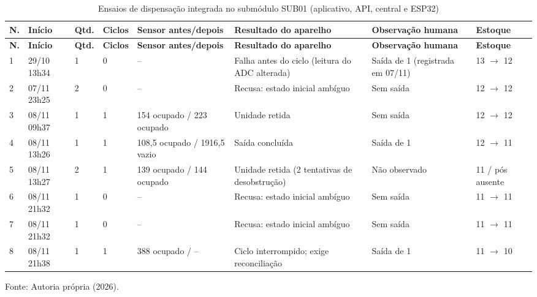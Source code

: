 
{\small\setlength{\tabcolsep}{3pt}\begin{longtable}{p{}p{}p{}p{}p{}p{}p{}p{}}
\caption{Ensaios de dispensação integrada no submódulo SUB01 (aplicativo, API, central e ESP32)}\label{tab:ensaios-dispensacao}\\
\hline
\textbf{N.} & \textbf{Início} & \textbf{Qtd.} & \textbf{Ciclos} & \textbf{Sensor antes/depois} & \textbf{Resultado do aparelho} & \textbf{Observação humana} & \textbf{Estoque}\\\hline
\endfirsthead\hline
\textbf{N.} & \textbf{Início} & \textbf{Qtd.} & \textbf{Ciclos} & \textbf{Sensor antes/depois} & \textbf{Resultado do aparelho} & \textbf{Observação humana} & \textbf{Estoque}\\\hline
\endhead
1 & 29/10 13h34 & 1 & 0 & -- & Falha antes do ciclo (leitura do ADC alterada) & Saída de 1 (registrada em 07/11) & 13 $\rightarrow$ 12\\\hline
2 & 07/11 23h25 & 2 & 0 & -- & Recusa: estado inicial ambíguo & Sem saída & 12 $\rightarrow$ 12\\\hline
3 & 08/11 09h37 & 1 & 1 & 154 ocupado / 223 ocupado & Unidade retida & Sem saída & 12 $\rightarrow$ 12\\\hline
4 & 08/11 13h26 & 1 & 1 & 108,5 ocupado / 1916,5 vazio & Saída concluída & Saída de 1 & 12 $\rightarrow$ 11\\\hline
5 & 08/11 13h27 & 2 & 1 & 139 ocupado / 144 ocupado & Unidade retida (2 tentativas de desobstrução) & Não observado & 11 / pós ausente\\\hline
6 & 08/11 21h32 & 1 & 0 & -- & Recusa: estado inicial ambíguo & Sem saída & 11 $\rightarrow$ 11\\\hline
7 & 08/11 21h32 & 1 & 0 & -- & Recusa: estado inicial ambíguo & Sem saída & 11 $\rightarrow$ 11\\\hline
8 & 08/11 21h38 & 1 & 1 & 388 ocupado / -- & Ciclo interrompido; exige reconciliação & Saída de 1 & 11 $\rightarrow$ 10\\\hline
\end{longtable}}{\small\noindent Fonte: Autoria própria (2026).\par}


